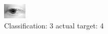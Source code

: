 \begin{figure}[h!]
\begin{center}
\includegraphics[width=0.60\columnwidth]{figures/ID2573_class_3_target_4.png}
\end{center}
\caption{ Classification: 3 actual target: 4}
\label{fig:ID2573_class_3_target_4}
\end{figure}
